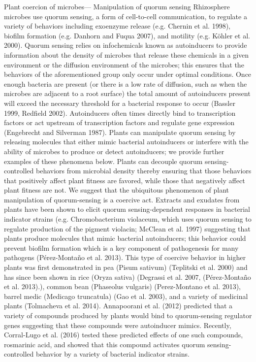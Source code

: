 \documentclass[PhD]{msu-thesis}
\begin{document}
Plant coercion of microbes— Manipulation of quorum sensing 
Rhizosphere microbes use quorum sensing, a form of cell-to-cell communication, to regulate a variety of behaviors including exoenzyme release (e.g. Chernin et al. 1998), biofilm formation (e.g. Danhorn and Fuqua 2007), and motility (e.g. Köhler et al. 2000). Quorum sensing relies on infochemicals known as autoinducers to provide information about the density of microbes that release these chemicals in a given environment or the diffusion environment of the microbes; this ensures that the behaviors of the aforementioned group only occur under optimal conditions. Once enough bacteria are present (or there is a low rate of diffusion, such as when the microbes are adjacent to a root surface) the total amount of autoinducers present will exceed the necessary threshold for a bacterial response to occur (Bassler 1999, Redfield 2002). Autoinducers often times directly bind to transcription factors or act upstream of transcription factors and regulate gene expression (Engebrecht and Silverman 1987). Plants can manipulate quorum sensing by releasing molecules that either mimic bacterial autoinducers or interfere with the ability of microbes to produce or detect autoinducers; we provide further examples of these phenomena below. Plants can decouple quorum sensing-controlled behaviors from microbial density thereby ensuring that those behaviors that positively affect plant fitness are favored, while those that negatively affect plant fitness are not. We suggest that the ubiquitous phenomenon of plant manipulation of quorum-sensing is a coercive act. 
Extracts and exudates from plants have been shown to elicit quorum sensing-dependent responses in bacterial indicator strains (e.g. Chromobacterium violaceum, which uses quorum sensing to regulate production of the pigment violacin; McClean et al. 1997) suggesting that plants produce molecules that mimic bacterial autoinducers; this behavior could prevent biofilm formation which is a key component of pathogenesis for many pathogens (Pérez-Montaño et al. 2013). This type of coercive behavior in higher plants was first demonstrated in pea (Pisum sativum) (Teplitski et al. 2000) and has since been shown in rice (Oryza sativa) (Degrassi et al. 2007, (Pérez-Montaño et al. 2013).), common bean (Phaseolus vulgaris) (Perez-Montano et al. 2013), barrel medic (Medicago truncatula) (Gao et al. 2003), and a variety of medicinal plants (Tolmacheva et al. 2014). Annapoorani et al. (2012) predicted that a variety of compounds produced by plants would bind to quorum-sensing regulator genes suggesting that these compounds were autoinducer mimics. Recently, Corral-Lugo et al. (2016) tested these predicted effects of one such compounds, rosmarinic acid, and showed that this compound activates quorum sensing-controlled behavior by a variety of bacterial indicator strains.
\end{document}
